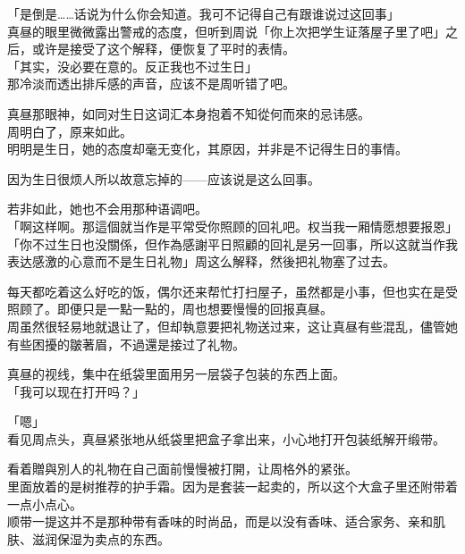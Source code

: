 「是倒是……话说为什么你会知道。我可不记得自己有跟谁说过这回事」\\

真昼的眼里微微露出警戒的态度，但听到周说「你上次把学生证落屋子里了吧」之后，或许是接受了这个解释，便恢复了平时的表情。\\

「其实，没必要在意的。反正我也不过生日」\\

那冷淡而透出排斥感的声音，应该不是周听错了吧。

真昼那眼神，如同对生日这词汇本身抱着不知從何而來的忌讳感。\\%

周明白了，原来如此。\\

明明是生日，她的态度却毫无变化，其原因，并非是不记得生日的事情。

因为生日很烦人所以故意忘掉的——应该说是这么回事。

若非如此，她也不会用那种语调吧。\\

「啊这样啊。那這個就当作是平常受你照顾的回礼吧。权当我一厢情愿想要报恩」\\

「你不过生日也没關係，但作為感謝平日照顧的回礼是另一回事，所以这就当作我表达感激的心意而不是生日礼物」周这么解释，然後把礼物塞了过去。

每天都吃着这么好吃的饭，偶尔还来帮忙打扫屋子，虽然都是小事，但也实在是受照顾了。即便只是一點一點的，周也想要慢慢的回报真昼。\\

周虽然很轻易地就退让了，但却執意要把礼物送过来，这让真昼有些混乱，儘管她有些困擾的皺著眉，不過還是接过了礼物。

真昼的视线，集中在纸袋里面用另一层袋子包装的东西上面。\\

「我可以现在打开吗？」

「嗯」\\

看见周点头，真昼紧张地从纸袋里把盒子拿出来，小心地打开包装纸解开缎带。

看着贈與別人的礼物在自己面前慢慢被打開，让周格外的紧张。\\

里面放着的是树推荐的护手霜。因为是套装一起卖的，所以这个大盒子里还附带着一点小点心。\\

顺带一提这并不是那种带有香味的时尚品，而是以没有香味、适合家务、亲和肌肤、滋润保湿为卖点的东西。

